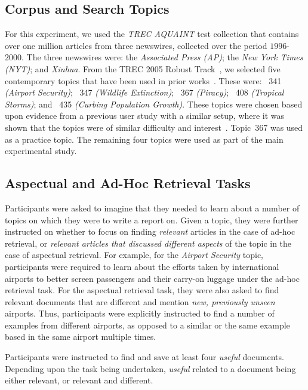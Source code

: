 \subsection{Corpus and Search Topics}\label{sec:method:corpus}
For this experiment, we used the \emph{TREC AQUAINT} test collection that contains over one million articles from three newswires, collected over the period $1996$-$2000$. The three newswires were: the \emph{Associated Press (AP)}; the \emph{New York Times (NYT)}; and \emph{Xinhua}.  From the TREC 2005 Robust Track~\cite{voorhees2006trec_robust}, we selected five contemporary topics that have been used in prior works~\cite{azzopardi2013query_cost,kelly2009query_suggestion,maxwell2017snippet_length}. These were: ~341 \emph{(Airport Security)}; ~347 \emph{(Wildlife Extinction)}; ~367 \emph{(Piracy)}; ~408 \emph{(Tropical Storms)}; and ~435 \emph{(Curbing Population Growth)}. These topics were chosen based upon evidence from a previous user study with a similar setup, where it was shown that the topics were of similar difficulty and interest~\cite{kelly2009query_suggestion}. Topic~367 was used as a practice topic. The remaining four topics were used as part of the main experimental study.

\subsection{Aspectual and Ad-Hoc Retrieval Tasks}
Participants were asked to imagine that they needed to learn about a number of topics on which they were to write a report on. Given a topic, they were further instructed on whether to focus on finding \emph{relevant} articles in the case of ad-hoc retrieval, or \emph{relevant articles that discussed different aspects} of the topic in the case of aspectual retrieval. For example, for the \emph{Airport Security} topic, participants were required to learn about the efforts taken by international airports to better screen passengers and their carry-on luggage under the ad-hoc retrieval task. For the aspectual retrieval task, they were also asked to find relevant documents that are different and mention \emph{new, previously unseen} airports. Thus, participants were explicitly instructed to find a number of examples from different airports, as opposed to a similar or the same example based in the same airport multiple times.

Participants were instructed to find and save at least four \emph{useful} documents. Depending upon the task being undertaken, \emph{useful} related to a document being either relevant, or relevant and different.

